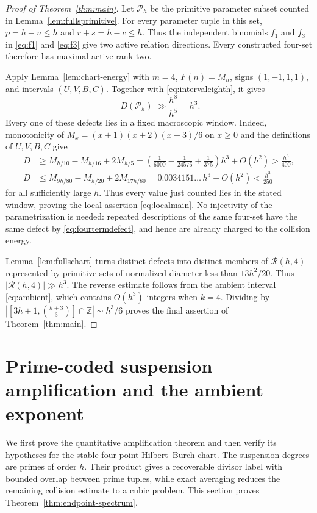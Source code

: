 \documentclass[11pt,reqno]{amsart}
\theoremstyle{definition}
\theoremstyle{remark}
\newcommand{\Rcal}{\mathcal R}
\begin{document}
\begin{proof}[Proof of Theorem~\ref{thm:main}]
Let $\mathcal P_h$ be the primitive parameter subset counted in
Lemma~\ref{lem:fullsprimitive}.  For every parameter tuple in this set,
$p=h-u\leq h$ and $r+s=h-c\leq h$.  Thus the independent binomials
$f_1$ and $f_3$ in \eqref{eq:f1} and \eqref{eq:f3} give two active relation
directions.  Every constructed four-set therefore has maximal active rank
two.

Apply Lemma~\ref{lem:chart-energy} with $m=4$, $F(n)=M_n$, signs
$(1,-1,1,1)$, and intervals $(U,V,B,C)$.  Together with
\eqref{eq:intervaleighth}, it gives
\[
 |D(\mathcal P_h)|
 \gg\frac{h^8}{h^5}=h^3.
\]
Every one of these defects lies in a fixed macroscopic window.  Indeed,
monotonicity of $M_x=(x+1)(x+2)(x+3)/6$ on $x\geq0$ and the definitions of
$U,V,B,C$ give
\begin{align*}
 D&\geq M_{h/10}-M_{h/16}+2M_{h/5}
     =\left(\frac1{6000}-\frac1{24576}+\frac1{375}\right)h^3+O(h^2)
     >\frac{h^3}{400},\\
 D&\leq M_{9h/80}-M_{h/20}+2M_{17h/80}
     =0.0034151\ldots\,h^3+O(h^2)
     <\frac{h^3}{250}
\end{align*}
for all sufficiently large $h$.  Thus every value just counted lies in the
stated window, proving the
local assertion \eqref{eq:localmain}.
No injectivity of the parametrization is needed: repeated descriptions
of the same four-set have the same defect by
\eqref{eq:fourtermdefect}, and hence are already charged to the collision
energy.

Lemma~\ref{lem:fullschart} turns distinct defects into distinct members
of $\Rcal(h,4)$ represented by primitive sets of normalized diameter less
than $13h^2/20$.  Thus $|\Rcal(h,4)|\gg h^3$.  The reverse estimate follows
from the ambient interval \eqref{eq:ambient}, which contains $O(h^3)$
integers when $k=4$.  Dividing by
$|[3h+1,\binom{h+3}{3}]\cap\mathbb Z|\sim h^3/6$ proves the final
assertion of Theorem~\ref{thm:main}.
\end{proof}

\section{Prime-coded suspension amplification and the ambient exponent}
\label{sec:endpoint-spectrum}

We first prove the quantitative amplification theorem and then verify its
hypotheses for the stable four-point Hilbert--Burch chart.  The suspension
degrees are primes of order $h$.  Their product gives a recoverable divisor
label with bounded overlap between prime tuples, while exact averaging
reduces the remaining collision estimate to a cubic problem.  This section
proves Theorem~\ref{thm:endpoint-spectrum}.
\end{document}
